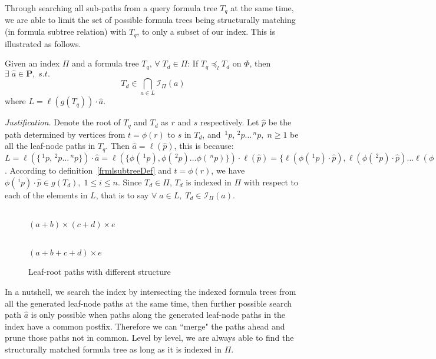 \documentclass{acm_proc_article-sp}
\begin{document}
Through searching all sub-paths from a query formula tree $T_q$ at the same time, we are able to limit the set of possible formula trees being structurally matching (in formula subtree relation) with $T_q$, to only a subset of our index. 
This is illustrated as follows.

Given an index $\Pi$ and a formula tree $T_q$, $\forall\; T_d \in \Pi$:
If $T_q \preceq_l T_d$ on $\Phi$, then $\exists\; \hat{a} \in \mathbf{P},\; s.t.$
$$
T_d \in \bigcap_{a \in L} \mathcal{I}_{\Pi}(a)
$$
where $L = \ell(g(T_q)) \cdot \hat{a}$.

\textit{Justification.}
Denote the root of $T_q$ and $T_d$ as $r$ and $s$ respectively.
Let $\hat{p}$ be the path determined by vertices from $t=\phi(r)$ to $s$ in $T_d$,
and $\,^1p, \,^2p \ldots \,^np,\; n \ge 1$ be all the leaf-node paths in $T_q$.
Then $\hat{a} = \ell(\hat{p})$, this is because:
$L = \ell(\{ \,^1p, \,^2p \ldots \,^np \}) \cdot \hat{a} = 
\ell(\{ \phi(\,^1p), \phi(\,^2p) \ldots \phi(\,^np) \}) \cdot \ell(\hat{p}) =
\{ \ell(\phi(\,^1p) \cdot \hat{p}), \ell(\phi(\,^2p) \cdot \hat{p}) \ldots \ell(\phi(\,^np) \cdot \hat{p}) \}
$.
According to definition~\ref{frmlsubtreeDef} and $t=\phi(r)$, we have $\phi(\,^ip) \cdot \hat{p} \in g(T_d),\; 1 \le i \le n$.
Since $ T_d \in \Pi$, $T_d$ is indexed in $\Pi$ with respect to each of the elements in $L$, that is to say $\forall\; a \in L, \; T_d \in \mathcal{I}_{\Pi}(a)$.

\begin{figure}
\begin{minipage}[b]{1.65in}
\begin{center}
\\ $(a+b) \times (c+d) \times e$
\end{center}
\end{minipage}
\hspace*{.0in}
\begin{minipage}[b]{1.60in}
\begin{center}
\\ $(a+b+c+d) \times e$
\end{center}
\end{minipage}
\caption{Leaf-root paths with different structure}\label{notnecessary}
\end{figure}

In a nutshell, we search the index by intersecting the indexed formula trees from all the generated leaf-node paths at the same time, then further possible search path $\hat{a}$ is only possible when paths along the generated leaf-node paths in the index have a common postfix.
Therefore we can ``merge" the paths ahead and prune those paths not in common. Level by level, we are always able to find the structurally matched formula tree as long as it is indexed in $\Pi$.
\end{document}
